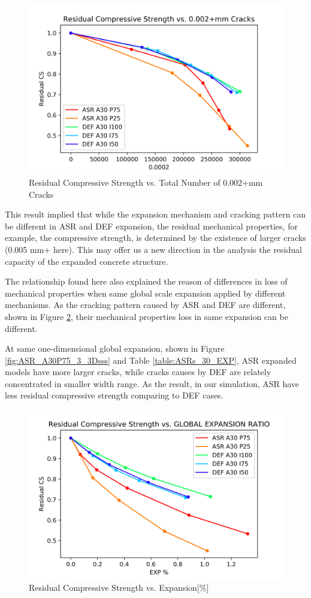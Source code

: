 \begin{figure}[ht!]
\centering
\includegraphics[width=.8\linewidth]{Files/exp_3D/3.png}
  \caption{Residual Compressive Strength vs. Total Number of 0.002+mm Cracks}
  \label{fig:c3}
\end{figure}


This result implied that while the expansion mechanism and cracking pattern can be different in ASR and DEF expansion, the residual mechanical properties, for example, the compressive strength, is determined by the existence of larger cracks (0.005 mm+ here). This may offer us a new direction in the analysis the residual capacity of the expanded concrete structure.

The relationship found here also explained the reason of differences in loss of mechanical properties when same global scale expansion applied by different mechanisms. As the cracking pattern caused by ASR and DEF are different, shown in Figure \ref{fig:expcs}, their mechanical properties loss in same expansion can be different.

At same one-dimensional global expansion, shown in Figure \ref{fig:ASR_A30P75_3_3Dsss} and Table \ref{table:ASRs_30_EXP}, ASR expanded models have more larger cracks, while cracks causes by DEF are relately concentrated in smaller width range. As the result, in our simulation, ASR have less residual compressive strength comparing to DEF cases.

\begin{figure}[ht!]
\centering
\includegraphics[width=.8\linewidth]{Files/exp_3D/EXPvsCS.png}
  \caption{Residual Compressive Strength vs. Expansion[\%]}
  \label{fig:expcs}
\end{figure}


